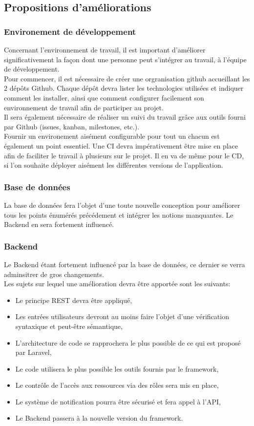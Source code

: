 \documentclass[
    iai, %
    il, %
]{heig-tb}
\begin{document}
\subsection{Propositions d'améliorations}

\subsubsection{Environement de développement}
Concernant l'environnement de travail, il est important d'améliorer significativement la façon dont
une personne peut s'intégrer au travail, à l'équipe de développement.\\
Pour commencer, il est nécessaire de créer une orgranisation github accueillant les 2 dépôts Github.
Chaque dépôt devra lister les technologies utilisées et indiquer comment les installer, ainsi que
comment configurer facilement son environnement de travail afin de participer au projet.\\
Il sera également nécessaire de réaliser un suivi du travail grâce aux outils fourni par Github (issues, kanban, milestones, etc.).\\
Fournir un environement aisément configurable pour tout un chacun est également un point essentiel.
Une CI devra impérativement être mise en place afin de faciliter le travail à plusieurs sur le projet. Il en va de même pour le CD, si l'on souhaite déployer aisément les différentes versions de l'application.

\subsubsection{Base de données}
La base de données fera l'objet d'une toute nouvelle conception pour améliorer tous les points énumérés précédement et intégrer les notions manquantes. Le Backend en sera fortement influencé.

\subsubsection{Backend}
Le Backend étant fortement influencé par la base de données, ce dernier se verra adminsitrer de gros changements.\\
Les sujets sur lequel une amélioration devra être apportée sont les suivants:
\begin{itemize}
    \item Le principe REST devra être appliqué,
    \item Les entrées utilisateurs devront au moins faire l'objet d'une vérification syntaxique et peut-être sémantique,
    \item L'architecture de code se rapprochera le plus possible de ce qui est proposé par Laravel,
    \item Le code utilisera le plus possible les outils fournis par le framework,
    \item Le contrôle de l'accès aux ressources via des rôles sera mis en place,
    \item Le système de notification pourra être sécurisé et fera appel à l'API,
    \item Le Backend passera à la nouvelle version du framework.
\end{itemize}
\end{document}
